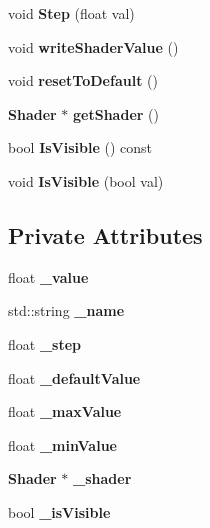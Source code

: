 \begin{DoxyCompactItemize}
\item 
void {\bfseries Step} (float val)\label{classSoundfieldViewer_1_1Property_ae4b5d5a66da6970be6841952a1b50a51}

\item 
void {\bfseries write\-Shader\-Value} ()\label{classSoundfieldViewer_1_1Property_ae4e0fb60533d1e12e002f023ac3b5bf3}

\item 
void {\bfseries reset\-To\-Default} ()\label{classSoundfieldViewer_1_1Property_a1990c0a0808a4689449994b43c6cdd68}

\item 
{\bf Shader} $\ast$ {\bfseries get\-Shader} ()\label{classSoundfieldViewer_1_1Property_a819189ee50db94e970b91c391de16625}

\item 
bool {\bfseries Is\-Visible} () const \label{classSoundfieldViewer_1_1Property_ab5c193dd629b0d1aed5a38dd7b3c50c7}

\item 
void {\bfseries Is\-Visible} (bool val)\label{classSoundfieldViewer_1_1Property_ad0167179d7637902b036a1d0dcae3ace}

\end{DoxyCompactItemize}
\subsection*{Private Attributes}
\begin{DoxyCompactItemize}
\item 
float {\bfseries \-\_\-value}\label{classSoundfieldViewer_1_1Property_ad4d01d95998eb831a7263abf3b8f4191}

\item 
std\-::string {\bfseries \-\_\-name}\label{classSoundfieldViewer_1_1Property_afca5614755fdce0ba96e520e03284b74}

\item 
float {\bfseries \-\_\-step}\label{classSoundfieldViewer_1_1Property_a652e6771f2698162bb60e21d6b67d657}

\item 
float {\bfseries \-\_\-default\-Value}\label{classSoundfieldViewer_1_1Property_ad478c6d43667267ee1410f9d10ccf842}

\item 
float {\bfseries \-\_\-max\-Value}\label{classSoundfieldViewer_1_1Property_a026724a0a01d14690ebcf792d022e4df}

\item 
float {\bfseries \-\_\-min\-Value}\label{classSoundfieldViewer_1_1Property_aa57a19cc8ad0d79ce9825cee958a59fa}

\item 
{\bf Shader} $\ast$ {\bfseries \-\_\-shader}\label{classSoundfieldViewer_1_1Property_a0d1a7f1127ef1a90a74a7a1bd17995c4}

\item 
bool {\bfseries \-\_\-is\-Visible}\label{classSoundfieldViewer_1_1Property_ab74a7ea8861e3b86f62302c90a214f9b}

\end{DoxyCompactItemize}



